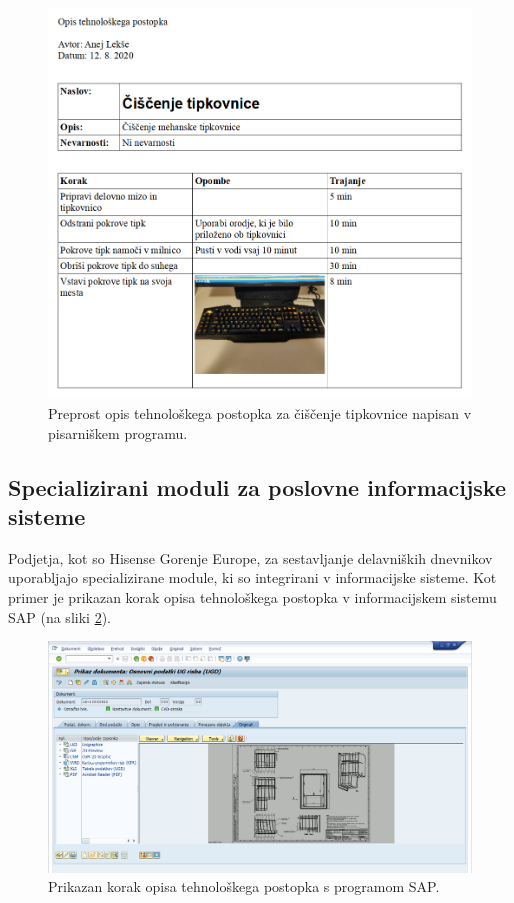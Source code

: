 \documentclass[a4paper, 12pt]{book}
\begin{document}
\begin{figure}[H]
\begin{center}
\includegraphics[width=13.5cm]{report_writer}
\end{center}
\caption{Preprost opis tehnološkega postopka za čiščenje tipkovnice napisan v pisarniškem programu.}
\label{report_writer}
\end{figure}



\subsection{Specializirani moduli za poslovne informacijske sisteme}

Podjetja, kot so Hisense Gorenje Europe, za sestavljanje delavniških dnevnikov uporabljajo specializirane module, ki so integrirani v informacijske sisteme.
Kot primer je prikazan korak opisa tehnološkega postopka v informacijskem sistemu SAP (na sliki \ref{sap_1}).

\begin{figure}[H]
\begin{center}
\includegraphics[width=13cm]{sap_1}
\end{center}
\caption{Prikazan korak opisa tehnološkega postopka s programom SAP.}
\label{sap_1}
\end{figure}
\end{document}
